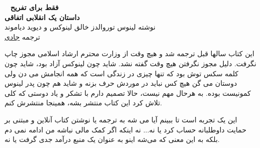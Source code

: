 \ 
\vfill
\noindent
\textbf{\Huge فقط برای تفریح} \vspace*{10pt} \\
\textbf{\Large داستان یک انقلابی اتفاقی} \vspace*{10pt} \\
نوشته لینوس توروالدز خالق لینوکس و دیوید دیاموند \\
ترجمه \href{http://www.jadi.net/}{جادی}

این کتاب سالها قبل ترجمه شد و هیچ وقت از وزارت محترم ارشاد اسلامی مجوز
چاپ نگرفت. دلیل مجوز نگرفتن هیچ وقت گفته نشد. شاید چون لینوکس آزاد
بود، شاید چون کلمه سکس توش بود که تنها چیزی در زندگی است که همه انجامش
می دن ولی دوستان می گن هیچ کس نباید در موردش حرف بزنه و شاید هم چون
پدر لینوس کمونیست بوده. به هرحال مهم نیست، حالا تصمیم دارم با تشکر و
یاد دوستی که کلی تلاش کرد این کتاب منتشر بشه، همینجا منتشرش کنم.

این یک تجربه است تا ببینم آیا می شه به ترجمه یا نوشتن کتاب آنلاین و
مبتنی بر حمایت داوطلبانه حساب کرد یا نه... نه اینکه اگر کمک مالی نباشه
من ادامه نمی دم بلکه به این معنی که می‌شه اینو به عنوان یک منبع درآمد
جدی گرفت یا نه.
\vfill
